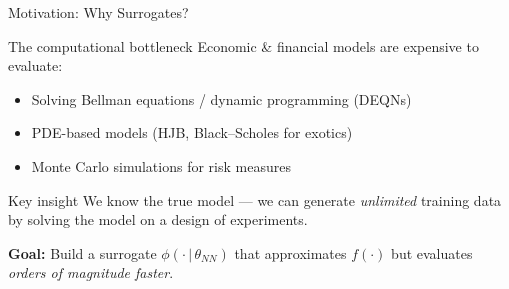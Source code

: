 \documentclass[aspectratio=169,11pt]{beamer}
\newcommand{\emphc}[1]{\textcolor{harvardcrimson}{#1}}
\begin{document}
\begin{frame}{Motivation: Why Surrogates?}
\begin{block}{The computational bottleneck}
Economic \& financial models are expensive to evaluate:
\begin{itemize}
  \item Solving Bellman equations / dynamic programming (DEQNs)
  \item PDE-based models (HJB, Black--Scholes for exotics)
  \item Monte Carlo simulations for risk measures
\end{itemize}
\end{block}

\vspace{0.3cm}
\begin{alertblock}{Key insight}
\emphc{We know the true model} --- we can generate \emph{unlimited} training data by solving the model on a design of experiments.
\end{alertblock}

\vspace{0.3cm}
\textbf{Goal:} Build a \emphc{surrogate} $\phi(\cdot\,|\,\theta_{NN})$ that approximates $f(\cdot)$ but evaluates \emph{orders of magnitude faster}.
\end{frame}
\end{document}

